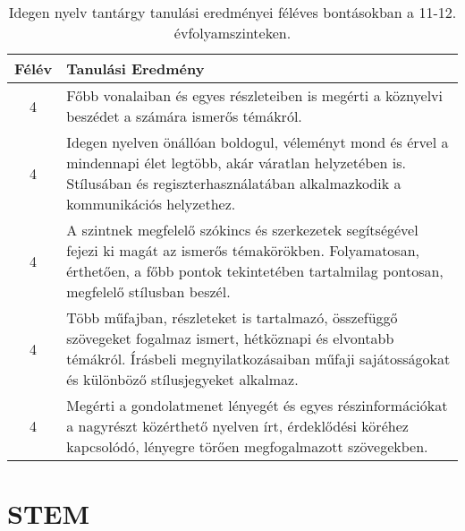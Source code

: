        
           \begin{longtable}{c | p{12cm} }
            \caption[Idegen nyelv 11-12.]{Idegen nyelv tantárgy tanulási eredményei féléves bontásokban a 11-12. évfolyamszinteken. }  \\

            \textbf{Félév} & \textbf{Tanulási Eredmény} \\
            \hline
            \endhead
                                
                                      
                                
                                      
                                
                                      
                                
                                      
                                
                                          4 &  Főbb vonalaiban és egyes részleteiben is megérti a köznyelvi beszédet a számára ismerős témákról. \\ \hline
                                          4 &  Idegen nyelven önállóan boldogul, véleményt mond és érvel a mindennapi élet legtöbb, akár váratlan helyzetében is. Stílusában és regiszterhasználatában alkalmazkodik a kommunikációs helyzethez. \\ \hline
                                          4 &  A szintnek megfelelő szókincs és szerkezetek segítségével fejezi ki magát az ismerős témakörökben. Folyamatosan, érthetően, a főbb pontok tekintetében tartalmilag pontosan, megfelelő stílusban beszél. \\ \hline
                                          4 &  Több műfajban, részleteket is tartalmazó, összefüggő szövegeket fogalmaz ismert, hétköznapi és elvontabb témákról. Írásbeli megnyilatkozásaiban műfaji sajátosságokat és különböző stílusjegyeket alkalmaz. \\ \hline
                                          4 &  Megérti a gondolatmenet lényegét és egyes részinformációkat a nagyrészt közérthető nyelven írt, érdeklődési köréhez kapcsolódó, lényegre törően megfogalmazott szövegekben. \\ \hline
                                      
                        \end{longtable}
            \clearpage

    

    \section{STEM}

